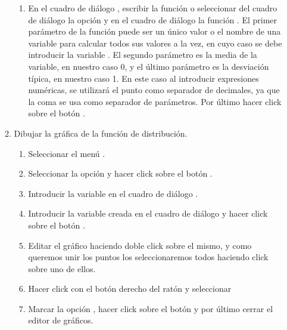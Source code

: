 \begin{enumerate}[leftmargin=*]
\begin{enumerate}
\begin{indicacion}
\begin{enumerate}
\item En el cuadro de diálogo , escribir la 
función  o seleccionar del cuadro 
de diálogo  la opción  y en el 
cuadro de diálogo  la 
función . El primer parámetro de la función 
 puede ser un único valor o el 
nombre de una variable para calcular todos sus valores a la vez, en cuyo 
caso se debe introducir la variable .
El segundo parámetro es la media de la variable, en nuestro caso 0, y el 
último parámetro es la desviación típica, en nuestro caso 1. En este caso 
al introducir expresiones numéricas, se utilizará el punto como 
separador de decimales, ya que la coma se usa como separador de 
parámetros. Por último hacer click sobre el botón .
\end{enumerate}
\end{indicacion}



\item Dibujar la gráfica de la función de distribución.
\begin{indicacion}
\begin{enumerate}
\item Seleccionar el menú .
\item Seleccionar la opción  y hacer click sobre el 
botón .
\item Introducir la variable  en el cuadro de diálogo 
.
\item Introducir la variable creada  en el cuadro 
de diálogo  y hacer click sobre el botón .
\item Editar el gráfico haciendo doble click sobre el mismo, y como 
queremos unir los puntos los seleccionaremos todos
haciendo click sobre uno de ellos.
\item Hacer click con el botón derecho del ratón y seleccionar 
\item Marcar la opción , hacer click sobre el botón 
 y por último cerrar el editor de gráficos.
\end{enumerate}
\end{indicacion}



\end{enumerate}
\end{enumerate}
